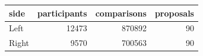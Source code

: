 \begin{tabular}{lrrr}
\toprule
side & participants & comparisons & proposals \\
\midrule
Left & 12473 & 870892 & 90 \\
Right & 9570 & 700563 & 90 \\
\bottomrule
\end{tabular}
